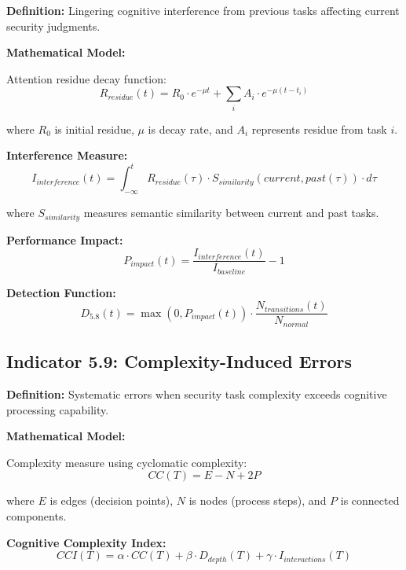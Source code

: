\documentclass[11pt,a4paper]{article}
\begin{document}
\textbf{Definition:} Lingering cognitive interference from previous tasks affecting current security judgments.

\textbf{Mathematical Model:}

Attention residue decay function:
\begin{equation}
R_{residue}(t) = R_0 \cdot e^{-\mu t} + \sum_{i} A_i \cdot e^{-\mu (t - t_i)}
\end{equation}

where $R_0$ is initial residue, $\mu$ is decay rate, and $A_i$ represents residue from task $i$.

\textbf{Interference Measure:}
\begin{equation}
I_{interference}(t) = \int_{-\infty}^{t} R_{residue}(\tau) \cdot S_{similarity}(current, past(\tau)) \cdot d\tau
\end{equation}

where $S_{similarity}$ measures semantic similarity between current and past tasks.

\textbf{Performance Impact:}
\begin{equation}
P_{impact}(t) = \frac{I_{interference}(t)}{I_{baseline}} - 1
\end{equation}

\textbf{Detection Function:}
\begin{equation}
D_{5.8}(t) = \max\left(0, P_{impact}(t)\right) \cdot \frac{N_{transitions}(t)}{N_{normal}}
\end{equation}

\subsection{Indicator 5.9: Complexity-Induced Errors}

\textbf{Definition:} Systematic errors when security task complexity exceeds cognitive processing capability.

\textbf{Mathematical Model:}

Complexity measure using cyclomatic complexity:
\begin{equation}
CC(T) = E - N + 2P
\end{equation}

where $E$ is edges (decision points), $N$ is nodes (process steps), and $P$ is connected components.

\textbf{Cognitive Complexity Index:}
\begin{equation}
CCI(T) = \alpha \cdot CC(T) + \beta \cdot D_{depth}(T) + \gamma \cdot I_{interactions}(T)
\end{equation}
\end{document}

